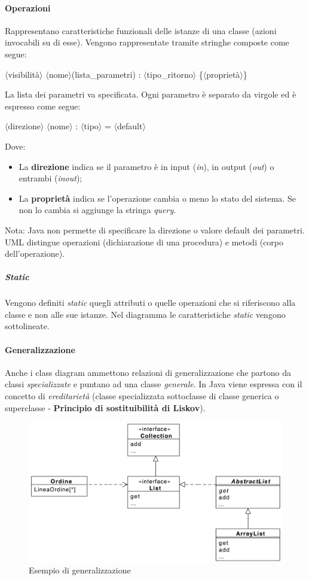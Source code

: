 \paragraph{Operazioni} Rappresentano caratteristiche funzionali delle istanze di una classe (azioni invocabili su di esse). Vengono rappresentate tramite stringhe composte come segue:
\begin{center}
        $\langle$visibilità$\rangle$ $\langle$nome$\rangle$(lista\_parametri) : $\langle$tipo\_ritorno$\rangle$ \{$\langle$proprietà$\rangle$\}
\end{center}
La lista dei parametri va specificata. Ogni parametro è separato da virgole ed è espresso come segue:
\begin{center}
        $\langle$direzione$\rangle$ $\langle$nome$\rangle$ : $\langle$tipo$\rangle$ = $\langle$default$\rangle$
\end{center}
Dove:
\begin{itemize}
    \item La \textbf{direzione} indica se il parametro è in input (\textit{in}), in output (\textit{out}) o entrambi (\textit{inout});
    \item La \textbf{proprietà} indica se l'operazione cambia o meno lo stato del sistema. Se non lo cambia si aggiunge la stringa \textit{query}.
\end{itemize}
Nota: Java non permette di specificare la direzione o valore default dei parametri.
UML distingue operazioni (dichiarazione di una procedura) e metodi (corpo dell'operazione).

\subparagraph{Static} Vengono definiti \textit{static} quegli attributi o quelle operazioni che si riferiscono alla classe e non alle sue istanze. Nel diagramma le caratteristiche \textit{static} vengono sottolineate.

\newpage

\paragraph{Generalizzazione} Anche i class diagram ammettono relazioni di generalizzazione che partono da classi \textit{specializzate} e puntano ad una classe \textit{generale}. In Java viene espressa con il concetto di \textit{ereditarietà} (classe specializzata sottoclasse di classe generica o superclasse - \textbf{Principio di sostituibilità di Liskov}).

\begin{figure}[H]
    \centering
    \includegraphics[width=0.75\linewidth]{assets/UML/class/class-8.png}
    \caption{Esempio di generalizzazione}
\end{figure}


